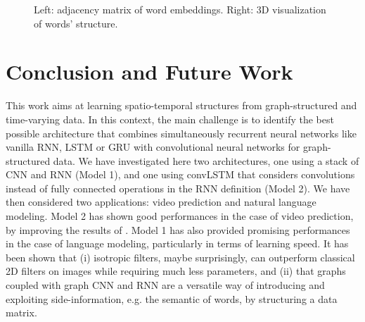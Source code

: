 \documentclass{article} %
\begin{document}
\begin{figure}[t]
	\centering
	\hspace{0.5cm}
	\vspace{-0.6cm}
	\caption{Left: adjacency matrix of word embeddings. Right: 3D visualization of words' structure.}
	\label{fig2}
\end{figure}

\section{Conclusion and Future Work}

This work aims at learning spatio-temporal structures from graph-structured and
time-varying data. In this context, the main challenge is to identify the best
possible architecture that combines simultaneously recurrent neural networks
like vanilla RNN, LSTM or GRU with convolutional neural networks for
graph-structured data. We have investigated here two architectures, one using a
stack of CNN and RNN (Model 1), and one using convLSTM that considers
convolutions instead of fully connected operations in the RNN definition (Model
2). We have then considered two applications: video prediction and natural
language modeling. Model 2 has shown good performances in the case of video
prediction, by improving the results of \citet{convlstm}. Model 1 has also
provided promising performances in the case of language modeling, particularly
in terms of learning speed. It has been shown that (i) isotropic filters, maybe
surprisingly, can outperform classical 2D filters on images while requiring
much less parameters, and (ii) that graphs coupled with graph CNN and RNN are a
versatile way of introducing and exploiting side-information, e.g. the semantic
of words, by structuring a data matrix.
\end{document}
